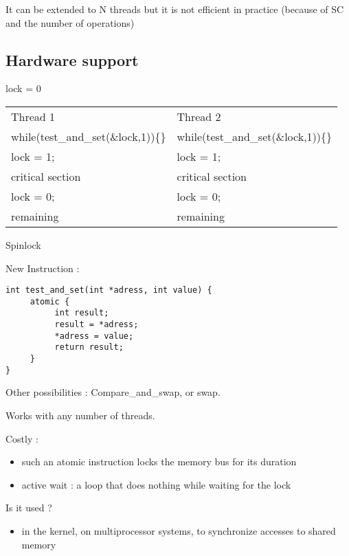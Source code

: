 \documentclass[a4paper,10pt]{article}
\begin{document}
It can be extended to N threads but it is not efficient in practice (because of SC and the number of operations)

\subsection{Hardware support}

\begin{centering}

lock = 0

\begin{tabular}{|ll|}
\hline
	Thread 1 & Thread 2 \\
	while(test\_and\_set(\&lock,1))\{\} & while(test\_and\_set(\&lock,1))\{\}\\
	lock = 1; & lock = 1; \\
	critical section & critical section\\
	lock = 0; & lock = 0; \\
	remaining & remaining\\
\hline
\end{tabular}

Spinlock

\end{centering}

New Instruction :

\begin{verbatim}
int test_and_set(int *adress, int value) {
     atomic {
          int result;
          result = *adress;
          *adress = value;
          return result;
     }
}
\end{verbatim}

Other possibilities : Compare\_and\_swap, or swap.
 
Works with any number of threads.

Costly :

\begin{itemize}
\item such an atomic instruction locks the memory bus for its duration
\item active wait : a loop that does nothing while waiting for the lock
\end{itemize}

Is it used ?
\begin{itemize}
\item in the kernel, on multiprocessor systems, to synchronize accesses to shared memory
\end{itemize}
 
\end{document}
